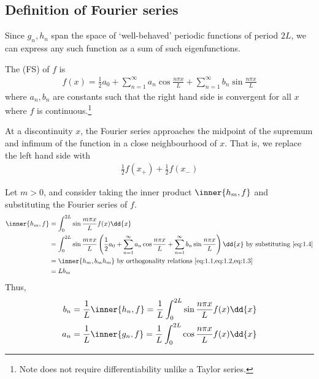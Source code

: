 \subsection{Definition of Fourier series}
Since $g_n, h_n$ span the space of `well-behaved' periodic functions of period $2L$, we can express any such function as a sum of such eigenfunctions.
\begin{definition}
    The  (FS) of $f$ is
    \begin{align} \label{eq:1.4}
        f(x) = \frac{1}{2}a_0 + \sum_{n=1}^\infty a_n \cos \frac{n \pi x}{L} + \sum_{n=1}^\infty b_n \sin \frac{n \pi x}{L}
    \end{align}
    where $a_n, b_n$ are constants such that the right hand side is convergent for all $x$ where $f$ is continuous.\footnote{Note does not require differentiability unlike a Taylor series.}
\end{definition}
At a discontinuity $x$, the Fourier series approaches the midpoint of the supremum and infimum of the function in a close neighbourhood of $x$.
That is, we replace the left hand side with
\begin{align*}
    \frac{1}{2}f(x_+) + \frac{1}{2}f(x_-)
\end{align*}

Let $m > 0$, and consider taking the inner product $\inner{h_m, f}$ and substituting the Fourier series of $f$.
\begin{align*}
    \inner{h_m, f} &= \int_0^{2L} \sin\frac{m \pi x}{L} f(x) \dd{x} \\
    &= \int_0^{2L} \sin\frac{m \pi x}{L} \left( \frac{1}{2}a_0 + \sum_{n=1}^\infty a_n \cos \frac{n \pi x}{L} + \sum_{n=1}^\infty b_n \sin \frac{n \pi x}{L} \right) \dd{x} \text{ by substituting \cref{eq:1.4}}\\
    & = \inner{h_m, b_m h_m} \text{ by orthogonality relations \cref{eq:1.1,eq:1.2,eq:1.3}}\\
    & = L b_m
\end{align*}
Thus,
\begin{equation} \label{eq:1.5}
    \begin{aligned}
    b_n = \frac{1}{L} \inner{h_n, f} = \frac{1}{L} \int_0^{2L} \sin\frac{n \pi x}{L} f(x) \dd{x} \\
    a_n = \frac{1}{L} \inner{g_n, f} = \frac{1}{L} \int_0^{2L} \cos\frac{n \pi x}{L} f(x) \dd{x}
    \end{aligned}
\end{equation}

